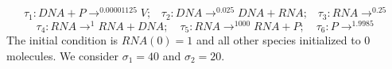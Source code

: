 \documentclass{llncs}
\begin{document}
\[\tau_1:  DNA + P \rightarrow^{0.00001125} V; \,\,\,\,\, \tau_2: DNA \rightarrow^{0.025} DNA + RNA; \,\,\,\,\,\tau_3: RNA \rightarrow^{0.25}                                   \]
\[\tau_4: RNA \rightarrow^{1} RNA + DNA; \,\,\,\,\,\, \tau_5: RNA \rightarrow^{1000} RNA + P; \,\,\,\,\,\,\tau_6: P \rightarrow^{1.9985}                                   \]
The initial condition is $RNA(0)=1$ and all other species initialized to $0$ molecules. We consider $\sigma_1=40$ and $\sigma_2=20$.
\end{document}
